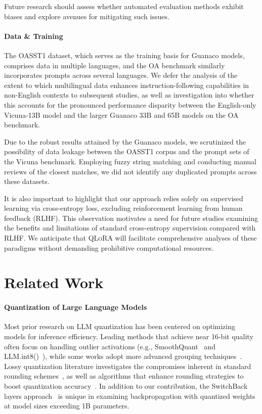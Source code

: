 Future research should assess whether automated evaluation methods exhibit biases and explore avenues for mitigating such issues.

\paragraph{Data \& Training} The OASST1 dataset, which serves as the training basis for {Guanaco} models, comprises data in multiple languages, and the OA benchmark similarly incorporates prompts across several languages. We defer the analysis of the extent to which multilingual data enhances instruction-following capabilities in non-English contexts to subsequent studies, as well as investigation into whether this accounts for the pronounced performance disparity between the English-only Vicuna-13B model and the larger {Guanaco} 33B and 65B models on the OA benchmark.

Due to the robust results attained by the {Guanaco} models, we scrutinized the possibility of data leakage between the OASST1 corpus and the prompt sets of the Vicuna benchmark. Employing fuzzy string matching and conducting manual reviews of the closest matches, we did not identify any duplicated prompts across these datasets.

It is also important to highlight that our approach relies solely on supervised learning via cross-entropy loss, excluding reinforcement learning from human feedback (RLHF). This observation motivates a need for future studies examining the benefits and limitations of standard cross-entropy supervision compared with RLHF. We anticipate that \textsc{QLoRA} will facilitate comprehensive analyses of these paradigms without demanding prohibitive computational resources.

\section{Related Work}

\paragraph{Quantization of Large Language Models} Most prior research on LLM quantization has been centered on optimizing models for inference efficiency. Leading methods that achieve near 16-bit quality often focus on handling outlier activations (e.g., SmoothQuant~\citep{xiao2022smoothquant} and LLM.int8()~\citep{dettmers2022llm}), while some works adopt more advanced grouping techniques~\citep{park2022nuqmm, yao2022zeroquant}. Lossy quantization literature investigates the compromises inherent in standard rounding schemes~\citep{dettmers2022case, zeng2022glm, pope2022efficiently}, as well as algorithms that enhance rounding strategies to boost quantization accuracy~\citep{frantar2022gptq}. In addition to our contribution, the SwitchBack layers approach~\citep{wortsman2023stable} is unique in examining backpropagation with quantized weights at model sizes exceeding 1B parameters.


